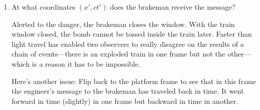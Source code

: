 \begin{enumerate}[wide]
\item At what coordinates $(x', ct')$ does the brakeman receive the message?
\answerspace{0.7in}

Alerted to the danger, the brakeman closes the window. With the train window closed, the bomb cannot be tossed inside the train later. Faster than light travel has enabled two observers to really disagree on the results of a chain of 
events---there is an exploded train in one frame but not the other---which is a reason it has to be impossible.  

Here's another issue:  Flip back to the platform frame to see that in this frame the engineer's message to the brakeman has traveled back in time.  It went forward in time (slightly) in one frame but backward in time in another.  

\end{enumerate}
